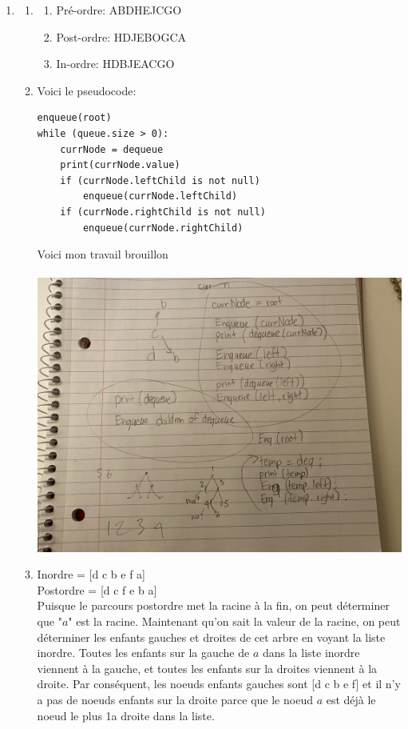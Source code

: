 \documentclass[12pt]{book}
\begin{document}
\begin{enumerate}
    \item
    \begin{enumerate}
        \item
        \begin{enumerate}
            \item Pré-ordre: ABDHEJCGO
            \item Post-ordre: HDJEBOGCA
            \item In-ordre: HDBJEACGO
        \end{enumerate}
        \item 
        Voici le pseudocode:
        \begin{verbatim}
enqueue(root)
while (queue.size > 0):
    currNode = dequeue
    print(currNode.value)
    if (currNode.leftChild is not null)
        enqueue(currNode.leftChild)
    if (currNode.rightChild is not null)
        enqueue(currNode.rightChild)
        \end{verbatim}
        Voici mon travail brouillon\\\\
        \includegraphics[scale=0.1]{csi2510lab3q2b.png}
        
        \item Inordre = [d c b e f a]\\Postordre = [d c f e b a]\\
        
        Puisque le parcours postordre met la racine à la fin, on peut déterminer que "$a$" est la racine. Maintenant qu'on sait la valeur de la racine, on peut déterminer les enfants gauches et droites de cet arbre en voyant la liste inordre. Toutes les enfants sur la gauche de $a$ dans la liste inordre viennent à la gauche, et toutes les enfants sur la droites viennent à la droite. Par conséquent, les noeuds enfants gauches sont [d c b e f] et il n'y a pas de noeuds enfants sur la droite parce que le noeud $a$ est déjà le noeud le plus 1a droite dans la liste.\\
        

\end{enumerate}
\end{enumerate}
\end{document}
